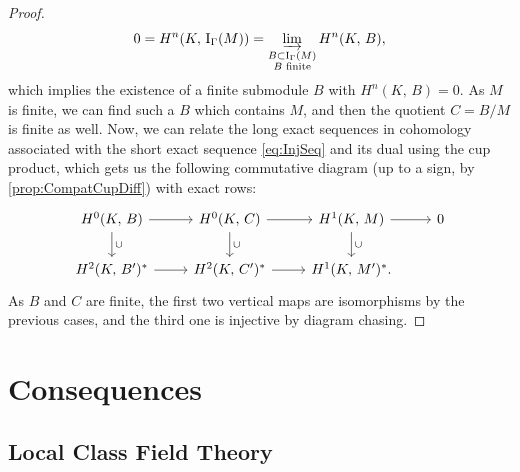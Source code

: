 \documentclass[a4paper, oneside]{memoir}
\def\K{K}
\renewcommand{\H}[3]{H^{#1}( #2, \, #3 )}
\newcommand{\Ind}[2]{\mathrm{I}_{#1}(#2)}
\theoremstyle{plain}
\theoremstyle{definition}
\theoremstyle{remark}
\begin{document}
\begin{proof}
    \[
        0=\H{n}{\K}{\Ind{\Gamma}{M}}=\varinjlim_{\substack{B\subset\Ind{\Gamma}{M} \\B\text{ finite}}}{\H{n}{\K}{B}},
    \]
    which implies the existence of a finite submodule \(B\) with \(\H{n}{\K}{B}=0\). As \(M\) is finite, we can find such a \(B\) which contains \(M\), and then
    the quotient \(C=B/M\) is finite as well.
    Now, we can relate the long exact sequences in cohomology associated with the short exact sequence \eqref{eq:InjSeq}
    and its dual using the cup product, which gets us the following commutative diagram (up to a sign, by \eqref{prop:CompatCupDiff}) with exact rows:
    \[
        \begin{tikzcd}
            \H{0}{\K}{B} \ar[r] \ar[d, "\cup"] & \H{0}{\K}{C} \ar[r] \ar[d, "\cup"] & \H{1}{\K}{M} \ar[d, "\cup"] \ar[r] & 0 \\
            \H{2}{\K}{B^\prime}^* \ar[r] & \H{2}{\K}{C^\prime}^* \ar[r] & \H{1}{\K}{M^\prime}^*.
        \end{tikzcd}
    \]
    As \(B\) and \(C\) are finite, the first two vertical maps are isomorphisms by the previous cases, and the third one is injective by diagram chasing.

\end{proof}


\chapter{Consequences}

\section{Local Class Field Theory}


\nocite{*}
\printbibliography
\end{document}
